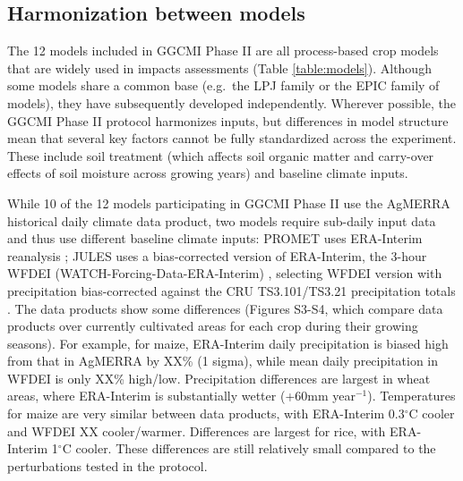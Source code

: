 \documentclass[gmd, manuscript]{copernicus} %
\begin{document}
\subsection{Harmonization between models}
The 12 models included in GGCMI Phase II are all process-based crop models that are widely used in impacts assessments (Table \ref{table:models}).
Although some models share a common base (e.g.\ the LPJ family or the EPIC family of models), they have subsequently developed independently.  
Wherever possible, the GGCMI Phase II protocol harmonizes inputs, but differences in model structure mean that several key factors cannot be fully standardized across the experiment. 
These include soil treatment (which affects soil organic matter and carry-over effects of soil moisture across growing years) and baseline climate inputs.  

While 10 of the 12 models participating in GGCMI Phase II use the AgMERRA historical daily climate data product, two models require sub-daily input data and thus use different baseline climate inputs:
PROMET uses ERA-Interim reanalysis \citep{dee2011era}; JULES uses a bias-corrected version of ERA-Interim, the 3-hour WFDEI (WATCH-Forcing-Data-ERA-Interim) \citep{weedon2014wfdei}, selecting WFDEI version with precipitation bias-corrected against the CRU TS3.101/TS3.21 precipitation totals \citep{harris_cru_2014}.
The data products show some differences (Figures S3-S4, which compare data products over currently cultivated areas for each crop during their growing seasons). 
For example, for maize, ERA-Interim daily precipitation is biased high from that in AgMERRA by XX\% (1 sigma), while mean daily precipitation in WFDEI is only XX\% high/low. 
Precipitation differences are largest in wheat areas, where ERA-Interim is substantially wetter (+60mm year$^{-1}$). 
Temperatures for maize are very similar between data products, with ERA-Interim 0.3$^\circ$C cooler and WFDEI XX cooler/warmer. 
Differences are largest for rice, with ERA-Interim 1$^\circ$C cooler. 
These differences are still relatively small compared to the perturbations tested in the protocol.
\end{document}
